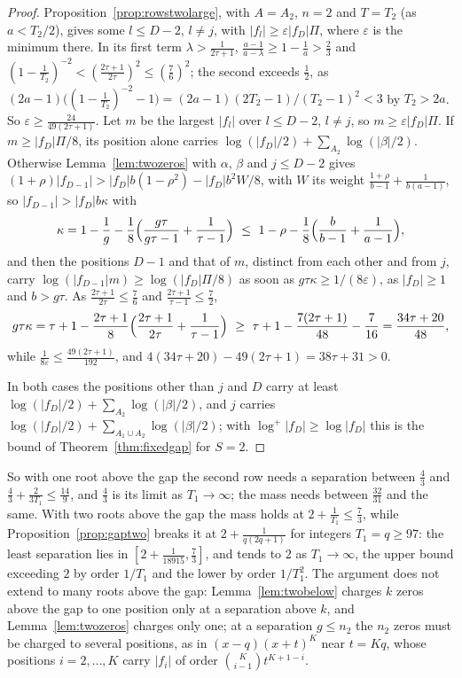 \documentclass[11pt]{article}
\begin{document}
\begin{proof}
Proposition~\ref{prop:rowstwolarge}, with $A=A_2$, $n=2$ and
$T=T_2$ (as $a<T_2/2$), gives some $l\le D-2$, $l\ne j$, with
$|f_l|\ge\varepsilon|f_D|\Pi$, where $\varepsilon$ is the minimum there.  In
its first term $\lambda>\frac1{2\tau+1}$, $\frac{a-1}{a-\lambda}\ge1-\frac1a>\frac23$
and $(1-\frac1{T_2})^{-2}<(\frac{2\tau+1}{2\tau})^2\le(\frac76)^2$; the second
exceeds $\frac12$, as $(2a-1)\bigl((1-\frac1{T_2})^{-2}-1\bigr)
=(2a-1)(2T_2-1)/(T_2-1)^2<3$ by $T_2>2a$.  So
$\varepsilon\ge\frac{24}{49(2\tau+1)}$.  Let $m$ be the largest $|f_l|$ over
$l\le D-2$, $l\ne j$, so $m\ge\varepsilon|f_D|\Pi$.  If
$m\ge|f_D|\Pi/8$, its position alone carries
$\log(|f_D|/2)+\sum_{A_2}\log(|\beta|/2)$.  Otherwise
Lemma~\ref{lem:twozeros} with $\alpha$, $\beta$ and $j\le D-2$ gives
$(1+\rho)|f_{D-1}|>|f_D|b(1-\rho^2)-|f_D|b^2W/8$, with $W$ its weight
$\frac{1+\rho}{b-1}+\frac1{b(a-1)}$, so $|f_{D-1}|>|f_D|b\kappa$ with
\[
  \kappa=1-\frac1g-\frac18\Bigl(\frac{g\tau}{g\tau-1}+\frac1{\tau-1}\Bigr)
  \ \le\ 1-\rho-\frac18\Bigl(\frac b{b-1}+\frac1{a-1}\Bigr),
\]
and then the positions $D-1$ and that of $m$, distinct from each other and
from $j$, carry $\log(|f_{D-1}|m)\ge\log(|f_D|\Pi/8)$ as soon as
$g\tau\kappa\ge1/(8\varepsilon)$, as $|f_D|\ge1$ and $b>g\tau$.  As
$\frac{2\tau+1}{2\tau}\le\frac76$ and $\frac{2\tau+1}{\tau-1}\le\frac72$,
\[
  g\tau\kappa=\tau+1-\frac{2\tau+1}8\Bigl(\frac{2\tau+1}{2\tau}+\frac1{\tau-1}\Bigr)
  \ \ge\ \tau+1-\frac{7(2\tau+1)}{48}-\frac7{16}=\frac{34\tau+20}{48},
\]
while $\frac1{8\varepsilon}\le\frac{49(2\tau+1)}{192}$, and
$4(34\tau+20)-49(2\tau+1)=38\tau+31>0$.

In both cases the positions other than $j$ and $D$ carry at least
$\log(|f_D|/2)+\sum_{A_2}\log(|\beta|/2)$, and $j$ carries
$\log(|f_D|/2)+\sum_{A_1\cup A_2}\log(|\beta|/2)$; with $\log^+|f_D|\ge\log|f_D|$
this is the bound of Theorem~\ref{thm:fixedgap} for $S=2$.
\end{proof}

So with one root above the gap the second row needs a separation between
$\frac43$ and $\frac43+\frac2{3T_1}\le\frac{14}9$, and $\frac43$ is its limit
as $T_1\to\infty$; the mass needs between $\frac{32}{31}$ and the same.  With
two roots above the gap the mass holds at $2+\frac1{T_1}\le\frac73$,
while Proposition~\ref{prop:gaptwo} breaks it at $2+\frac1{q(2q+1)}$ for
integers $T_1=q\ge97$: the least separation lies in $[2+\frac1{18915},\frac73]$,
and tends to $2$ as $T_1\to\infty$, the upper bound exceeding $2$ by order
$1/T_1$ and the lower by order $1/T_1^2$.  The argument does not extend to
many roots above the gap: Lemma~\ref{lem:twobelow} charges $k$ zeros above
the gap to one position only at a separation above $k$, and
Lemma~\ref{lem:twozeros} charges only one; at a separation $g\le n_2$ the
$n_2$ zeros must be charged to several positions, as in $(x-q)(x+t)^K$ near
$t=Kq$, whose positions $i=2,\ldots,K$ carry $|f_i|$ of order
$\binom K{i-1}t^{K+1-i}$.
\end{document}
